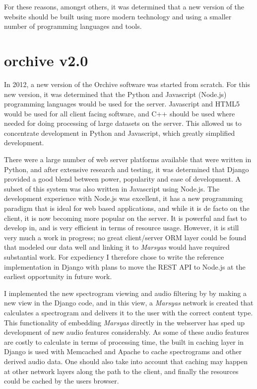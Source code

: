 \documentclass[12pt,oneside]{book}
\begin{document}
For these reasons, amongst others, it was determined that a new
version of the website should be built using more modern technology
and using a smaller number of programming languages and tools.

\section{orchive v2.0}
\label{section:softwareAndSystems:orchiveV2}

In 2012, a new version of the Orchive software was started from
scratch.  For this new version, it was determined that the Python and
Javascript (Node.js) programming languages would be used for the
server.  Javascript and HTML5 would be used for all client facing
software, and C++ should be used where needed for doing processing of
large datasets on the server.  This allowed us to concentrate
development in Python and Javascript, which greatly simplified
development.

There were a large number of web server platforms available that were
written in Python, and after extensive research and testing, it was
determined that Django provided a good blend between power, popularity
and ease of development.  A subset of this system was also written in
Javascript using Node.js.  The development experience with Node.js was
excellent, it has a new programming paradigm that is ideal for web
based applications, and while it is de facto on the client, it is now
becoming more popular on the server.  It is powerful and fast to
develop in, and is very efficient in terms of resource usage.
However, it is still very much a work in progress; no great
client/server ORM layer could be found that modeled our data well and
linking it to \textit{Marsyas} would have required substantial work.  For
expediency I therefore chose to write the reference
implementation in Django with plans to move the REST API to Node.js at
the earliest opportunity in future work.

I implemented the new spectrogram viewing and audio filtering by by
making a new view in the Django code, and in this view, a \textit{Marsyas}
network is created that calculates a spectrogram and delivers it to
the user with the correct content type.  This functionality of
embedding \textit{Marsyas} directly in the webserver has sped up development of
new audio features considerably.  As some of these audio features are
costly to calculate in terms of processing time, the built in caching
layer in Django is used with Memcached and Apache to cache
spectrograms and other derived audio data.  One should also take into
account that caching may happen at other network layers along the path
to the client, and finally the resources could be cached by the users
browser.
\end{document}
